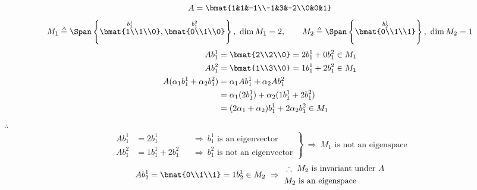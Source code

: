 \begin{example}
\[
A=\bmat{1&1&-1\\-1&3&-2\\0&0&1}
\]
\[
M_1\triangleq\Span\left\{\overset{b_1^1}{\bmat{1\\1\\0}},\overset{b_1^2}{\bmat{0\\1\\0}}\right\},\ \dim M_1=2,
\qquad
M_2\triangleq\Span\left\{\overset{b_2^1}{\bmat{0\\1\\1}}\right\},\ \dim M_2=1
\]
\begin{align*}
Ab_1^1&=\bmat{2\\2\\0}=2b_1^1+0b_1^2\in M_1\\
Ab_1^2&=\bmat{1\\3\\0}=1b_1^1+2b_1^2\in M_1\\
A(\alpha_1b_1^1+\alpha_2b_1^2)&=\alpha_1Ab_1^1+\alpha_2Ab_1^2\\
&=\alpha_1(2b_1^1)+\alpha_2(1b_1^1+2b_1^2)\\
&=(2\alpha_1+\alpha_2)b_1^1+2\alpha_2b_1^2\in M_1
\end{align*}
$\therefore$ 
\[
\left.\begin{aligned}
Ab_1^1&=2b_1^1 &&\Rightarrow\ b_1^1\text{ is an eigenvector}\\
Ab_1^2&=1b_1^1+2b_1^2 &&\Rightarrow\ b_1^2\text{ is not an eigenvector}
\end{aligned}\right\}\ \Rightarrow\ M_1\text{ is not an eigenspace}
\]
\[
Ab_2^1=\bmat{0\\1\\1}=1b_2^1\in M_2\ \Rightarrow\
\begin{aligned}
&\therefore\ M_2\text{ is invariant under }A\\
&M_2\text{ is an eigenspace}
\end{aligned}
\]


\end{example}
